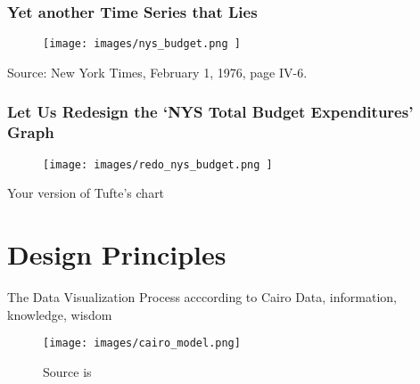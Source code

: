 \documentclass[aspectratio=1610]{beamer}
\begin{document}
\begin{frame}
	\frametitle{Yet another Time Series that Lies}
	\begin{figure}
		\begin{small}
			\begin{center}
				\texttt{[image: 
					images/nys\_budget.png
				]}
			\end{center}
		\end{small}
	\end{figure}

	\footnotesize
	Source: New York Times, February 1, 1976, page IV-6.
\end{frame}

\begin{frame}
	\frametitle{Let Us Redesign the `NYS Total Budget Expenditures' Graph}
	\begin{figure}
		\begin{small}
			\begin{center}
				\texttt{[image: 
					images/redo\_nys\_budget.png
				]}
			\end{center}
		\end{small}
	\end{figure}
\end{frame}

\begin{frame}{}
	\LARGE \centering Your version of Tufte's chart
\end{frame}

\section{Design Principles}

\begin{frame}{The Data Visualization Process acccording to Cairo}
	{Data, information, knowledge, wisdom}{}
	\begin{figure}
		\texttt{[image: images/cairo\_model.png]}
		\caption*{Source is \cite[][page 29]{cairo2012}}
	\end{figure}
\end{frame}
\end{document}
